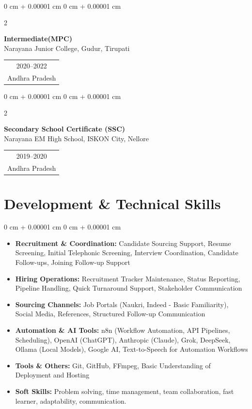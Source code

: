 \documentclass[10pt, a4paper]{article}
\makeatletter
\newenvironment{highlights}{
    \begin{itemize}[
        topsep=0.06 cm,
        parsep=0.04 cm,
        partopsep=0pt,
        itemsep=0.02 cm,
        leftmargin=0 cm + 10pt
    ]
}{
    \end{itemize}
}
\newenvironment{onecolentry}{
    \begin{adjustwidth}{
        0 cm + 0.00001 cm
    }{
        0 cm + 0.00001 cm
    }
}{
    \end{adjustwidth}
}
\newenvironment{twocolentry}[2][4.5 cm]{
    \onecolentry
    \def\secondColumn{#2}
    \setcolumnwidth{\fill, #1}
    \begin{paracol}{2}
}{
    \switchcolumn \raggedleft \secondColumn
    \end{paracol}
    \endonecolentry
}
\newcommand{\eduDateBlock}[2]{
    \begin{tabular}[t]{@{}c@{}}
        \normalsize #1 \\
        \normalsize #2
    \end{tabular}
}
\makeatother
\begin{document}
    \vspace{0.10 cm}
    \begin{twocolentry}{
        \eduDateBlock{2020--2022}{Andhra Pradesh}
    }
        \textbf{Intermediate(MPC)}\\
        Narayana Junior College, Gudur, Tirupati
    \end{twocolentry}

    \vspace{0.10 cm}
    \begin{twocolentry}{
        \eduDateBlock{2019--2020}{Andhra Pradesh}
    }
        \textbf{Secondary School Certificate (SSC)}\\
        Narayana EM High School, ISKON City, Nellore
    \end{twocolentry}

    \section{Development \& Technical Skills}

    \begin{onecolentry}
        \begin{highlights}
            \item \textbf{Recruitment \& Coordination:} Candidate Sourcing Support, Resume Screening, Initial Telephonic Screening, Interview Coordination, Candidate Follow-ups, Joining Follow-up Support
            \item \textbf{Hiring Operations:} Recruitment Tracker Maintenance, Status Reporting, Pipeline Handling, Quick Turnaround Support, Stakeholder Communication
            \item \textbf{Sourcing Channels:} Job Portals (Naukri, Indeed - Basic Familiarity), Social Media, References, Structured Follow-up Communication
            \item \textbf{Automation \& AI Tools:} n8n (Workflow Automation, API Pipelines, Scheduling), OpenAI (ChatGPT), Anthropic (Claude), Grok, DeepSeek, Ollama (Local Models), Google AI, Text-to-Speech for Automation Workflows
            \item \textbf{Tools \& Others:} Git, GitHub, FFmpeg, Basic Understanding of Deployment and Hosting
            \item \textbf{Soft Skills:} Problem solving, time management, team collaboration, fast learner, adaptability, communication.
        \end{highlights}
    \end{onecolentry}
\end{document}
